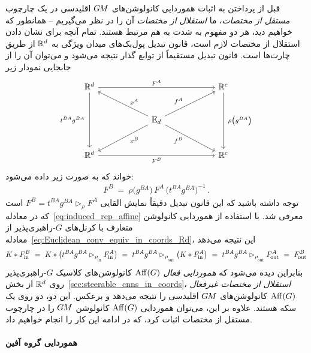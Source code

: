 قبل از پرداختن به اثبات هموردایی کانولوشن‌های $G\mkern-1.4muM$ اقلیدسی در یک چارچوب \emph{مستقل از مختصات}، ما \emph{استقلال از مختصات} آن را در نظر می‌گیریم -- همانطور که خواهیم دید، هر دو مفهوم به شدت به هم مرتبط هستند.
تمام آنچه برای نشان دادن استقلال از مختصات لازم است، قانون تبدیل پول‌بک‌های میدان ویژگی به $\mathbb{R}^d$ از طریق چارت‌ها است.
قانون تبدیل مستقیماً از توابع گذار نتیجه می‌شود و می‌توان آن را از جابجایی نمودار زیر
\begin{equation}\label{cd:feature_field_chart_pullback_Rd_transitions}
	\begin{tikzcd}[row sep=2.5em, column sep=6em]
		\R^d
		\arrow[rr, "{F^A}"]
		\arrow[dd, "{t^{BA} g^{BA}}\ "']
		& &
		\R^c
		\arrow[dd, "{\ \rho\big( g^{BA} \big)}"]
		\\
		&
		\Euc_d
		\arrow[ul, pos=.4, "{x^A}"']
		\arrow[dl, pos=.4, "{x^B}"]
		\arrow[ur, pos=.4, "{f^A}"]
		\arrow[dr, pos=.4, "{f^B}"']
		\\
		\R^d
		\arrow[rr, "{F^B}"']
		& &
		\R^c
	\end{tikzcd}
\end{equation}
خواند که به صورت زیر داده می‌شود:
\begin{align}
	F^B\ =\ \rho\big( g^{BA} \big) \,F^A\, \big( t^{BA} g^{BA} \big)^{-1} \,.
\end{align}
توجه داشته باشید که این قانون تبدیل دقیقاً نمایش القایی $F^B = t^{BA}g^{BA} \rhd_\rho F^A$ است که در معادله~\eqref{eq:induced_rep_affine} معرفی شد.
با استفاده از هموردایی کانولوشن متعارف با کرنل‌های $G$-راهبری‌پذیر از معادله~\eqref{eq:Euclidean_conv_equiv_in_coords_Rd}، این نتیجه می‌دهد
\begin{align}\label{eq:Euclidean_conv_coordinate_independence}
	K*\Fin^B
	\ =\ K* \big( t^{BA} g^{BA} \rhd_{\rhoin} \Fin^A \big)
	\ =\ t^{BA} g^{BA} \rhd_{\rhoout} \big( K * \Fin^A \big)
	\ =\ t^{BA} g^{BA} \rhd_{\rhoout} \Fout^A
	\ =\ \Fout^B
\end{align}
بنابراین دیده می‌شود که \emph{هموردایی فعال $\operatorname{Aff}(G)$} کانولوشن‌های کلاسیک $G$-راهبری‌پذیر روی $\mathbb{R}^d$ از بخش~\ref{sec:steerable_cnns_in_coords}، \emph{استقلال از مختصات غیرفعال $\operatorname{Aff}(G)$} کانولوشن‌های $G\mkern-1.4muM$ اقلیدسی را نتیجه می‌دهد و برعکس.
این دو، دو روی یک سکه هستند.
علاوه بر این، می‌توان هموردایی $\operatorname{Aff}(G)$ کانولوشن $G\mkern-1.4muM$ را در چارچوب مستقل از مختصات اثبات کرد، که در ادامه این کار را انجام خواهیم داد.

\paragraph{هموردایی گروه آفین}

